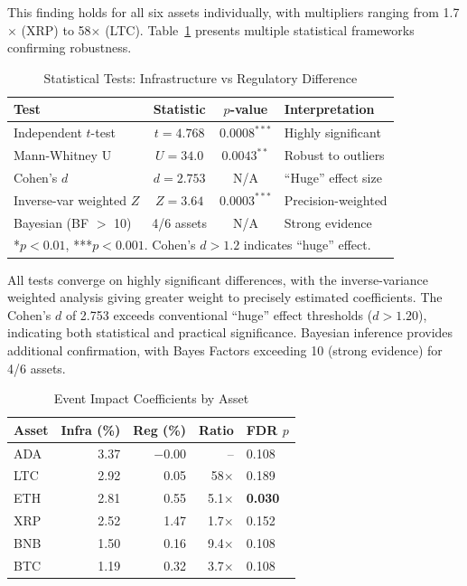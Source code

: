 \documentclass[pdflatex,sn-mathphys-num]{sn-jnl}
\theoremstyle{thmstyleone}
\theoremstyle{thmstyletwo}
\theoremstyle{thmstylethree}
\begin{document}
This finding holds for all six assets individually, with multipliers ranging from 1.7$\times$ (XRP) to 58$\times$ (LTC). Table~\ref{tab:stat_tests} presents multiple statistical frameworks confirming robustness.

\begin{table}[htbp]
\centering
\caption{Statistical Tests: Infrastructure vs Regulatory Difference}\label{tab:stat_tests}
\small
\begin{tabular}{@{}lccp{3.5cm}@{}}
\toprule
\textbf{Test} & \textbf{Statistic} & \textbf{$p$-value} & \textbf{Interpretation} \\
\midrule
Independent $t$-test & $t = 4.768$ & $0.0008^{***}$ & Highly significant \\
Mann-Whitney U & $U = 34.0$ & $0.0043^{**}$ & Robust to outliers \\
Cohen's $d$ & $d = 2.753$ & N/A & ``Huge'' effect size \\
Inverse-var weighted $Z$ & $Z = 3.64$ & $0.0003^{***}$ & Precision-weighted \\
Bayesian (BF $>$ 10) & 4/6 assets & N/A & Strong evidence \\
\bottomrule
\multicolumn{4}{l}{\footnotesize **$p<0.01$, ***$p<0.001$. Cohen's $d > 1.2$ indicates ``huge'' effect.}
\end{tabular}
\end{table}

All tests converge on highly significant differences, with the inverse-variance weighted analysis giving greater weight to precisely estimated coefficients. The Cohen's $d$ of 2.753 exceeds conventional ``huge'' effect thresholds ($d > 1.20$), indicating both statistical and practical significance. Bayesian inference provides additional confirmation, with Bayes Factors exceeding 10 (strong evidence) for 4/6 assets.

\begin{table}[htbp]
\centering
\caption{Event Impact Coefficients by Asset}\label{tab:event_coefficients}
\small
\begin{tabular}{@{}lrrrl@{}}
\toprule
\textbf{Asset} & \textbf{Infra (\%)} & \textbf{Reg (\%)} & \textbf{Ratio} & \textbf{FDR $p$} \\
\midrule
ADA & 3.37 & $-0.00$ & -- & 0.108 \\
LTC & 2.92 & 0.05 & 58$\times$ & 0.189 \\
ETH & 2.81 & 0.55 & 5.1$\times$ & \textbf{0.030} \\
XRP & 2.52 & 1.47 & 1.7$\times$ & 0.152 \\
BNB & 1.50 & 0.16 & 9.4$\times$ & 0.108 \\
BTC & 1.19 & 0.32 & 3.7$\times$ & 0.108 \\
\bottomrule
\end{tabular}
\end{table}
\end{document}
